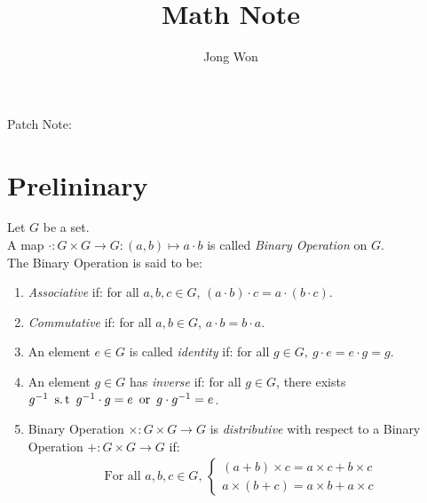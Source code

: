 \documentclass[twoside,openright]{report}
\title{Math Note}
\author{Jong Won}
\affil{University of Seoul, Mathematics}
\date{}
\begin{document}
\maketitle

\newpage
\tableofcontents

\newpage
\noindent Patch Note: \\



\newpage

\chapter{Prelininary}
\begin{definition}
    Let $G$ be a set. \\
    A map $\cdot: G \times G \to G : (a, b) \mapsto a \cdot b$ is called \textit{Binary Operation} on $G$. \\
    The Binary Operation is said to be:
    \begin{enumerate}
        \item \textit{Associative} if: for all $a, b, c \in G$, $(a \cdot b) \cdot c = a \cdot (b \cdot c)$.
        \item \textit{Commutative} if: for all $a, b \in G$, $a \cdot b = b \cdot a$.
        \item An element $e \in G$ is called \textit{identity} if: for all $g \in G,\ g \cdot e = e \cdot g = g$.
        \item An element $g \in G$ has \textit{inverse} if: for all $g \in G$, there exists $g^{-1} \st g^{-1} \cdot g = e\ \operatorname{or}\ g \cdot g^{-1} = e$.
        \item Binary Operation $\times:G \times G \to G$ is \textit{distributive} with respect to a Binary Operation $+:G \times G \to G$ if:
        \begin{align*}
            \text{For all $a,b,c \in G$, }
            \begin{cases}
                (a + b) \times c = a \times c + b \times c \\
                a \times (b + c) = a \times b + a \times c
            \end{cases}
        \end{align*}
    \end{enumerate}
\end{definition}
\end{document}
